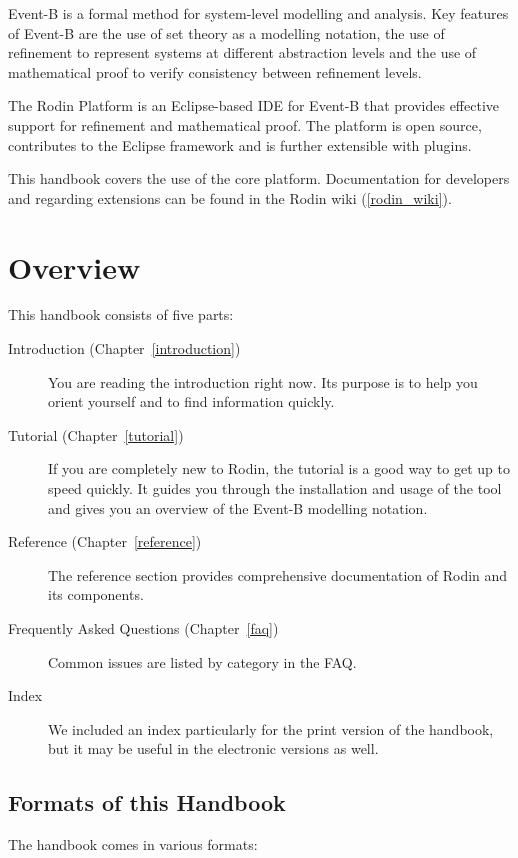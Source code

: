 \documentclass[12pt]{book}
\begin{document}
Event-B is a formal method for system-level modelling and analysis. Key features of Event-B are the use of set theory as a modelling notation, the use of refinement to represent systems at different abstraction levels and the use of mathematical proof to verify consistency between refinement levels.

The Rodin Platform is an Eclipse-based IDE for Event-B that provides effective support for refinement and mathematical proof. The platform is open source, contributes to the Eclipse framework and is further extensible with plugins. 

This handbook covers the use of the core platform.  Documentation for developers and regarding extensions can be found in the Rodin wiki (\ref{rodin_wiki}).

\section{Overview}

This handbook consists of five parts:

\begin{description}
	\item[Introduction (Chapter~\ref{introduction})] You are reading the introduction right now.  Its purpose is to help you orient yourself and to find information quickly.
	\item[Tutorial (Chapter~\ref{tutorial})] If you are completely new to Rodin, the tutorial is a good way to get up to speed quickly.  It guides you through the installation and usage of the tool and gives you an overview of the Event-B modelling notation.
	\item[Reference (Chapter~\ref{reference})] The reference section provides comprehensive documentation of Rodin and its components.
	\item[Frequently Asked Questions  (Chapter~\ref{faq})] Common issues are listed by category in the FAQ.
	\item[Index] We included an index particularly for the print version of the handbook, but it may be useful in the electronic versions as well.  
\end{description}

\subsection{Formats of this Handbook}
\label{handbook_formats}

The handbook comes in various formats:
\end{document}
